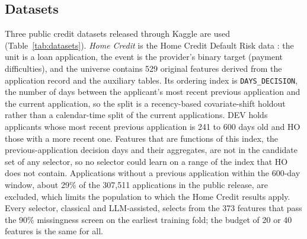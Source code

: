 \documentclass[final,5p,twocolumn]{elsarticle}
\begin{document}
\subsection{Datasets}
\label{subsec:datasets}

Three public credit datasets released through Kaggle are used (Table~\ref{tab:datasets}). \emph{Home Credit} is the Home Credit Default Risk data \cite{homecredit2018}: the unit is a loan application, the event is the provider's binary target (payment difficulties), and the universe contains 529 original features derived from the application record and the auxiliary tables. Its ordering index is \texttt{DAYS\_DECISION}, the number of days between the applicant's most recent previous application and the current application, so the split is a recency-based covariate-shift holdout rather than a calendar-time split of the current applications. DEV holds applicants whose most recent previous application is 241 to 600 days old and HO those with a more recent one. Features that are functions of this index, the previous-application decision days and their aggregates, are not in the candidate set of any selector, so no selector could learn on a range of the index that HO does not contain. Applications without a previous application within the 600-day window, about 29\% of the 307,511 applications in the public release, are excluded, which limits the population to which the Home Credit results apply. Every selector, classical and LLM-assisted, selects from the 373 features that pass the 90\% missingness screen on the earliest training fold; the budget of 20 or 40 features is the same for all.
\end{document}
